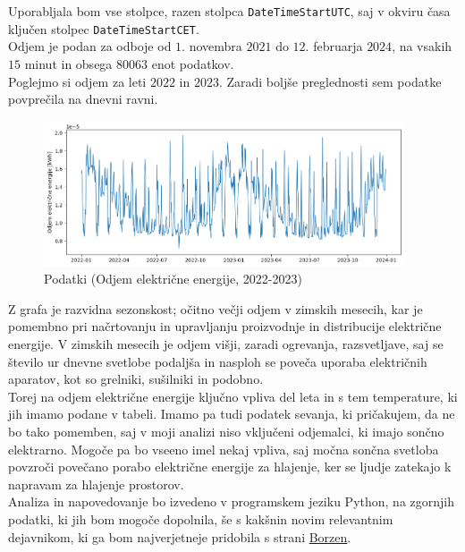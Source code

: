 \documentclass[a4paper, 10pt]{article}
\begin{document}
\noindent Uporabljala bom vse stolpce, razen stolpca \texttt{DateTimeStartUTC}, saj v 
okviru časa ključen stolpec \texttt{DateTimeStartCET}.  \\

\noindent Odjem je podan za odboje od $1$. novembra $2021$ do $12$. februarja $2024$, 
na vsakih $15$ minut in obsega $80063$ enot podatkov. \\

\noindent Poglejmo si odjem za leti $2022$ in $2023$. Zaradi boljše preglednosti sem podatke povprečila na dnevni ravni.

\begin{figure}[h!]
    \centering
    \caption{Podatki (Odjem električne energije, 2022-2023)}\par\medskip
    \includegraphics[width=0.95\textwidth]{output.png}
\end{figure}

\noindent Z grafa je razvidna sezonskost; očitno večji odjem v zimskih mesecih, kar je pomembno pri 
načrtovanju in upravljanju proizvodnje in distribucije električne energije. 
V zimskih mesecih je odjem višji, zaradi ogrevanja, razsvetljave, saj se število ur 
dnevne svetlobe podaljša in nasploh se poveča uporaba električnih aparatov, kot 
so grelniki, sušilniki in podobno.  \\

\noindent Torej na odjem električne energije ključno vpliva del leta in s tem temperature, 
ki jih imamo podane v tabeli. Imamo pa tudi podatek 
sevanja, ki pričakujem, da ne bo tako pomemben, saj v moji analizi niso 
vključeni odjemalci, ki imajo sončno elektrarno. Mogoče pa bo vseeno 
imel nekaj vpliva, saj močna sončna svetloba povzroči povečano porabo 
električne energije za hlajenje, ker se ljudje zatekajo k napravam za 
hlajenje prostorov. \\

\noindent Analiza in napovedovanje bo izvedeno v programskem jeziku Python, na zgornjih podatki, ki jih bom 
mogoče dopolnila, še s kakšnin novim relevantnim dejavnikom, ki ga bom najverjetneje pridobila
s strani \href{https://ot.borzen.si/Domov/Podatki-trga/Koli%C4%8Dine-in-zneski-izravnave}{Borzen}. \\
\end{document}
